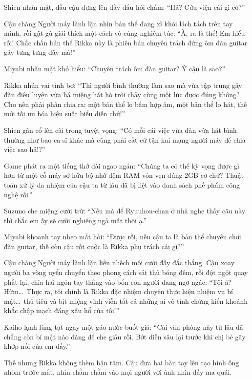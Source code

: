 \documentclass[../main.tex]{subfiles}
\begin{document}
Shien nhăn mặt, đầu cậu dựng lên đầy dấu hỏi chấm: ``Hả? Cứu viện cái gì cơ?''


Cậu chàng Người máy lành lặn nhìn bản thể đang xì khói lách tách trên tay mình, rồi gật gù giải thích một cách vô cùng nghiêm túc: ``À, ra là thế! Em hiểu rồi! Chắc chắn bản thể Rikka này là phiên bản chuyên trách đứng ôm đàn guitar gảy tưng tưng đây mà!''

Miyabi nhăn mặt khó hiểu: ``Chuyên trách ôm đàn guitar? Ý cậu là sao?''

Rikka nhún vai tỉnh bơ: ``Thì người bình thường làm sao mà vừa tập trung gảy đàn điêu luyện vừa há miệng hát hò trôi chảy cùng một lúc được đúng không? Cho nên phải phân chia ra: một bản thể lo bấm hợp âm, một bản thể lo hát, thế mới tối ưu hóa hiệu suất biểu diễn chứ!''

Shien gân cổ lên cãi trong tuyệt vọng: ``Có mỗi cái việc vừa đàn vừa hát bình thường như bao ca sĩ khác mà cũng phải cắt cử tận hai mạng người máy để chia việc sao hả!?''

Game phát ra một tiếng thở dài ngao ngán: ``Chúng ta có thể kỳ vọng được gì hơn từ một cỗ máy sở hữu bộ nhớ đệm RAM vỏn vẹn đúng 2GB cơ chứ? Thuật toán xử lý đa nhiệm của cậu ta từ lâu đã bị liệt vào danh sách phế phẩm công nghệ rồi.''

Suzuno che miệng cười trừ: ``Nếu mà để Ryuuhou-chan ở nhà nghe thấy câu này thì chắc em ấy sẽ cười nghiêng ngả mất thôi ạ.''

Miyabi khoanh tay nheo mắt hỏi: ``Được rồi, nếu cậu ta là bản thể chuyên chơi đàn guitar, thế còn cậu rốt cuộc là Rikka phụ trách cái gì?''

Cậu chàng Người máy lành lặn liền nhếch môi cười đầy đắc thắng. Cậu xoay người ba vòng uyển chuyển theo phong cách sát thủ bóng đêm, rồi đột ngột quay phắt lại, chĩa hai ngón tay thẳng vào bốn con người đang ngơ ngác: ``Tôi á? Hừm\dots\ Thực ra, tôi chính là Rikka đặc nhiệm chuyên thực hiện nhiệm vụ bí mật\dots\ thủ tiêu và bịt miệng vĩnh viễn tất cả những ai vô tình chứng kiến khoảnh khắc chập mạch đáng xấu hổ của tôi!''


Kaiho lạnh lùng tạt ngay một gáo nước buốt giá: ``Cái văn phòng này từ lâu đã chẳng còn bí mật nào đáng để che giấu rồi. Bớt diễn sâu lại trước khi chị bẻ gãy khớp nối của em đấy.''

Thế nhưng Rikka không thèm bận tâm. Cậu đưa hai bàn tay lên tạo hình ống nhòm trước mắt, nhìn chằm chằm vào mọi người với ánh nhìn đầy ma quái.
\end{document}
